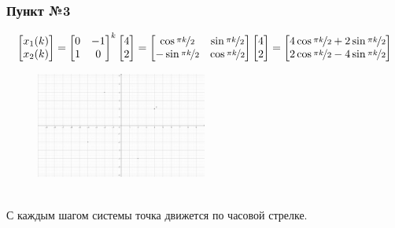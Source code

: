 \documentclass[a3paper,14pt]{extarticle}
\begin{document}
\subsubsection*{Пункт №3}
$$\begin{bmatrix}
    x_1(k) \\ x_2(k)
\end{bmatrix} = \begin{bmatrix}
    0 & -1 \\ 1 & 0
\end{bmatrix}^k\begin{bmatrix}
    4 \\ 2
\end{bmatrix} = \begin{bmatrix}
    \cos{\nicefrac{\pi k}{2}} & \sin{\nicefrac{\pi k}{2}} \\
    -\sin{\nicefrac{\pi k}{2}} & \cos{\nicefrac{\pi k}{2}}
\end{bmatrix}\begin{bmatrix}
    4 \\ 2
\end{bmatrix} = \begin{bmatrix}
    4\cos{\nicefrac{\pi k}{2}}+2\sin{\nicefrac{\pi k}{2}} \\
    2\cos{\nicefrac{\pi k}{2}}-4\sin{\nicefrac{\pi k}{2}}
\end{bmatrix}$$
\begin{figure}[h]
    \centering\includegraphics[width=0.5\textwidth]{4.3.png}
\end{figure} \\
С каждым шагом системы точка движется по часовой стрелке.
\pagebreak
\end{document}
